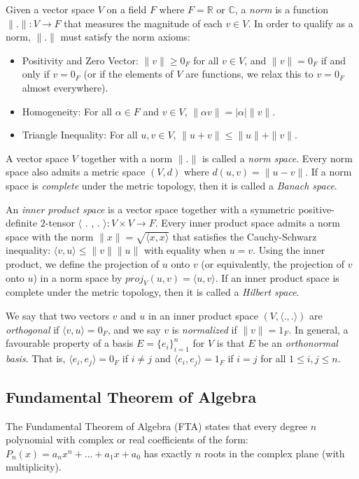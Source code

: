 \documentclass[12pt]{article}
\begin{document}
Given a vector space $V$ on a field $F$ where $F = \mathbb{R}$ or $\mathbb{C}$, 
a {\it norm} is a function 
$\|.\| : V \rightarrow F$ that measures the magnitude of each $v\in V$.
In order to qualify as a norm, $\|.\|$ must satisfy the norm axioms:
\begin{itemize}
\item Positivity and Zero Vector:
$\|v\| \geq 0_F$ for all $v \in V$, and $\|v\| = 0_F$ if and only if
$v=0_F$ (or if the elements of $V$ are functions, we relax this to 
$v = 0_F$ almost everywhere).
\item Homogeneity: For all $\alpha\in F$ and $v\in V$, 
$\|\alpha v\| = |\alpha|\|v\|$.
\item Triangle Inequality: For all $u,v\in V$, $\|u+v\| \leq \|u\|+\|v\|$.
\end{itemize}
A vector space $V$ together with a norm $\|.\|$ is called a {\it norm space}.
Every norm space also admits a metric space $(V,d)$ where $d(u,v) = \|u-v\|$.
If a norm space is {\it complete} under the metric topology, then it is called
a {\it Banach space}.

An {\it inner product space} is a vector space together with a symmetric
positive-definite $2$-tensor
$\langle \text{ . , . } \rangle : V \times V \rightarrow F$.
Every inner product space admits a norm space with the norm
$\|x\| = \sqrt{\langle x, x\rangle}$ that satisfies the Cauchy-Schwarz
inequality: $\langle v, u\rangle \leq \|v\| \|u\|$ with equality when
$u = v$.
Using the inner product, we define the projection of $u$ onto $v$
(or equivalently, the projection of $v$ onto $u$) in a norm
space by $proj_V(u,v) = \langle u, v \rangle$.
If an inner product space is complete under the metric topology, then it is 
called a {\it Hilbert space}.

We say that two vectors $v$ and $u$ in an inner product space 
$(V, \langle.,.\rangle)$ are {\it orthogonal}
if $\langle v, u\rangle = 0_F$, and we say $v$ is {\it normalized} if 
$\|v\|=1_F$.
In general, a favourable property of a basis $E = \{e_i\}_{i=1}^n$ for $V$ is 
that $E$ be an {\it orthonormal basis}.
That is, $\langle e_i, e_j\rangle = 0_F$ if $i\neq j$ and 
$\langle e_i, e_j\rangle = 1_F$ if $i=j$ for all $1 \leq i,j\leq n$.

\subsection*{Fundamental Theorem of Algebra}

The Fundamental Theorem of Algebra (FTA) states that every degree $n$ polynomial
with complex or real coefficients of the form:
$P_n(x) = a_n x^n + \ldots + a_1 x + a_0$ has exactly $n$ roots in the complex 
plane (with multiplicity).
\end{document}
